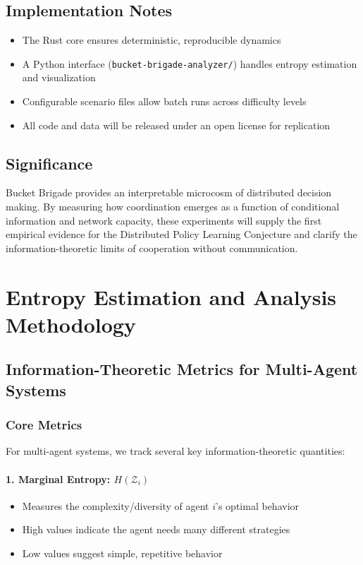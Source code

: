 \documentclass[10pt, letterpaper]{article}
\begin{document}
\subsection{Implementation Notes}

\begin{itemize}
    \item The Rust core ensures deterministic, reproducible dynamics
    \item A Python interface (\texttt{bucket-brigade-analyzer/}) handles entropy estimation and visualization
    \item Configurable scenario files allow batch runs across difficulty levels
    \item All code and data will be released under an open license for replication
\end{itemize}

\subsection{Significance}

Bucket Brigade provides an interpretable microcosm of distributed decision making. By measuring how coordination emerges as a function of conditional information and network capacity, these experiments will supply the first empirical evidence for the Distributed Policy Learning Conjecture and clarify the information-theoretic limits of cooperation without communication.

\section{Entropy Estimation and Analysis Methodology}
\label{app:entropy}

\subsection{Information-Theoretic Metrics for Multi-Agent Systems}

\subsubsection{Core Metrics}

For multi-agent systems, we track several key information-theoretic quantities:

\paragraph{1. Marginal Entropy: $H(\mathcal{Z}_i)$}
\begin{itemize}
    \item Measures the complexity/diversity of agent $i$'s optimal behavior
    \item High values indicate the agent needs many different strategies
    \item Low values suggest simple, repetitive behavior
\end{itemize}
\end{document}
